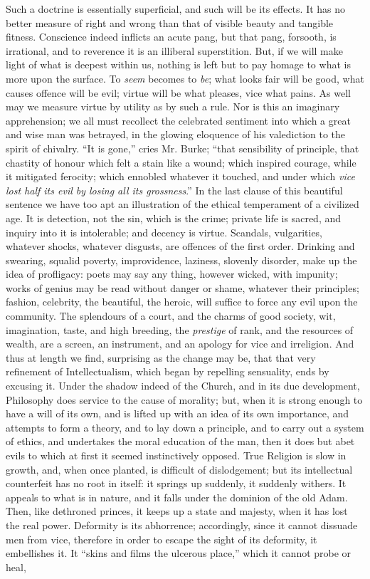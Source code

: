 Such a doctrine is essentially superficial, and such will be its
effects. It has no better measure of right and wrong than that of
visible beauty and tangible fitness. Conscience indeed inflicts an
acute pang, but that pang, forsooth, is irrational, and to reverence
it is an illiberal superstition. But, if we will make light of what is
deepest within us, nothing is left but to pay homage to what is more
upon the surface. To \emph{seem} becomes to \emph{be}; what looks fair
will be good, what causes offence will be evil; virtue will be what
pleases, vice what pains. As well may we measure virtue by utility as
by such a rule. Nor is this an imaginary apprehension; we all must
recollect the celebrated sentiment into which a great and wise man was
betrayed, in the glowing eloquence of his valediction to the spirit of
chivalry. ``It is gone,'' cries Mr. Burke; ``that
sensibility of principle, that chastity of honour which felt a stain
like a wound; which inspired courage, while it mitigated ferocity;
which ennobled whatever it touched, and under which \emph{vice lost half
its evil by losing all its grossness}.'' In the last clause of
this beautiful sentence we have too apt an illustration of the ethical
temperament of a civilized age. It is detection, not the sin, which is
the crime; private life is sacred, and inquiry into it is intolerable;
and decency is virtue. Scandals, vulgarities, whatever shocks,
whatever disgusts, are offences of the first order. Drinking and
swearing, squalid poverty, improvidence, laziness, slovenly disorder,
make up the idea of profligacy: poets may say any thing, however
wicked, with impunity; works of genius may be read without danger or
shame, whatever their principles; fashion, celebrity, the
beautiful, the heroic, will suffice to force any evil upon the
community. The splendours of a court, and the charms of good society,
wit, imagination, taste, and high breeding, the \emph{prestige} of
rank, and the resources of wealth, are a screen, an instrument, and an
apology for vice and irreligion. And thus at length we find,
surprising as the change may be, that that very refinement of
Intellectualism, which began by repelling sensuality, ends by excusing
it. Under the shadow indeed of the Church, and in its due development,
Philosophy does service to the cause of morality; but, when it is
strong enough to have a will of its own, and is lifted up with an idea
of its own importance, and attempts to form a theory, and to lay down
a principle, and to carry out a system of ethics, and undertakes the
moral education of the man, then it does but abet evils to which at
first it seemed instinctively opposed. True Religion is slow in
growth, and, when once planted, is difficult of dislodgement; but its
intellectual counterfeit has no root in itself: it springs up
suddenly, it suddenly withers. It appeals to what is in nature, and it
falls under the dominion of the old Adam. Then, like dethroned
princes, it keeps up a state and majesty, when it has lost the real
power. Deformity is its abhorrence; accordingly, since it cannot
dissuade men from vice, therefore in order to escape the sight of its
deformity, it embellishes it. It ``skins and films the ulcerous
place,'' which it cannot probe or heal,

